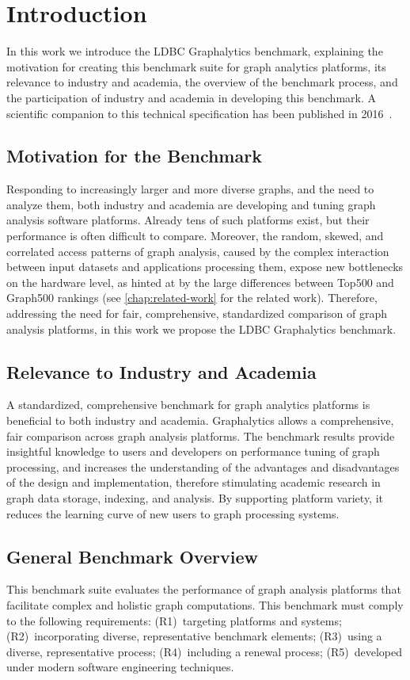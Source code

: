 \chapter{Introduction}
\label{chap:introduction}
In this work we introduce the LDBC Graphalytics benchmark, explaining the motivation for creating this benchmark suite for graph analytics platforms, its relevance to industry and academia, the overview of the benchmark process, and the participation of industry and academia in developing this benchmark. A scientific companion to this technical specification has been published in 2016~\cite{DBLP:journals/pvldb/IosupHNHPMCCSATXNB16}.

\section{Motivation for the Benchmark}
Responding to increasingly larger and more diverse graphs, and the need to analyze them, both industry and academia are developing and tuning graph analysis software platforms. Already tens of such platforms exist,	but their performance is often difficult to compare. Moreover, the random, skewed, and correlated access patterns of graph analysis, caused by the complex interaction between input datasets and applications processing them, expose new bottlenecks on the hardware level, as hinted at by the large differences between Top500 and Graph500 rankings (see \autoref{chap:related-work} for the related work). Therefore, addressing the need for fair, comprehensive, standardized comparison of graph analysis platforms, in this work we propose the LDBC Graphalytics benchmark.

\section{Relevance to Industry and Academia}
A standardized, comprehensive benchmark for graph analytics platforms is beneficial to both industry and academia. Graphalytics allows a comprehensive, fair comparison across graph analysis platforms. The benchmark results provide insightful knowledge to users and developers on performance tuning of graph processing, and increases the understanding of the advantages and disadvantages of the design and implementation, therefore stimulating academic research in graph data storage, indexing, and analysis. By supporting platform variety, it reduces the learning curve of new users to graph processing systems.

\section{General Benchmark Overview}
This benchmark suite evaluates the performance of graph analysis platforms that facilitate complex and holistic graph computations. This benchmark must comply to the following requirements:
(R1)~targeting platforms and systems;
(R2)~incorporating diverse, representative benchmark elements;
(R3)~using a diverse, representative process;
(R4)~including a renewal process;
(R5)~developed under modern software engineering techniques.

